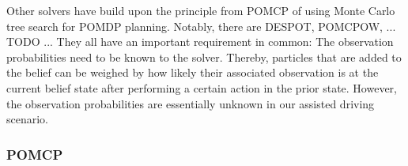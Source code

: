 





Other solvers have build upon the principle from POMCP of using Monte Carlo tree search for POMDP planning. 
Notably, there are DESPOT, POMCPOW, ... TODO ...
They all have an important requirement in common: The observation probabilities need to be known to the solver. Thereby, particles that are added to the belief can be weighed by how likely their associated observation is at the current belief state after performing a certain action in the prior state. However, the observation probabilities are essentially unknown in our assisted driving scenario. 


\subsubsection{POMCP}
\label{sec:pomcp}



